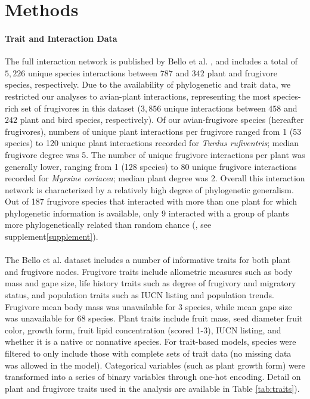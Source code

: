 \documentclass[openacc]{rsproca_new}%
\begin{document}
\section*{Methods}

\paragraph{Trait and Interaction Data}
The full interaction network is published by Bello et al. \cite{bello2017}, and includes a total of $5,226$ unique species interactions between $787$ and $342$ plant and frugivore species, respectively. Due to the availability of phylogenetic and trait data, we restricted our analyses to avian-plant interactions, representing the most species-rich set of frugivores in this dataset ($3,856$ unique interactions between $458$ and $242$ plant and bird species, respectively). Of our avian-frugivore species (hereafter frugivores), numbers of unique plant interactions per frugivore ranged from 1 (53 species) to 120 unique plant interactions recorded for \emph{Turdus rufiventris}; median frugivore degree was 5. The number of unique frugivore interactions per plant was generally lower, ranging from 1 (128 species) to 80 unique frugivore interactions recorded for \emph{Myrsine coriacea}; median plant degree was 2. Overall this interaction network is characterized by a relatively high degree of phylogenetic generalism. Out of 187 frugivore species that interacted with more than one plant for which phylogenetic information is available, only 9 interacted with a group of plants more phylogenetically related than random chance (\cite{kembel2010picante}, see supplement\ref{supplement}). 

\paragraph*{}
The Bello et al. dataset includes a number of informative traits for both plant and frugivore nodes. Frugivore traits include allometric measures such as body mass and gape size, life history traits such as degree of frugivory and migratory status, and population traits such as  IUCN listing and population trends. Frugivore mean body mass was unavailable for 3 species, while mean gape size was unavailable for 68 species. Plant traits include fruit mass, seed diameter fruit color, growth form, fruit lipid concentration (scored 1-3), IUCN listing, and whether it is a native or nonnative species. For trait-based models, species were filtered to only include those with complete sets of trait data (no missing data was allowed in the model). Categorical variables (such as plant growth form) were transformed into a series of binary variables through one-hot encoding. Detail on plant and frugivore traits used in the analysis are available in Table \ref{tab:traits}).
\end{document}
